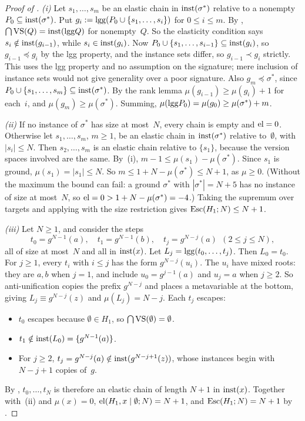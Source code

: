 \begin{proof}[Proof of ]
\emph{(i)} Let $s_1,\dots,s_m$ be an elastic chain in $\mathrm{inst}(\sigma^*)$ relative to a nonempty $P_0\subseteq\mathrm{inst}(\sigma^*)$. Put $g_i:=\mathrm{lgg}(P_0\cup\{s_1,\dots,s_i\})$ for $0\le i\le m$. By , $\bigcap\mathrm{VS}(Q)=\mathrm{inst}(\mathrm{lgg} Q)$ for nonempty~$Q$. So the elasticity condition says $s_i\notin\mathrm{inst}(g_{i-1})$, while $s_i\in\mathrm{inst}(g_i)$. Now $P_0\cup\{s_1,\dots,s_{i-1}\}\subseteq\mathrm{inst}(g_i)$, so $g_{i-1}\preceq g_i$ by the lgg property, and the instance sets differ, so $g_{i-1}\prec g_i$ strictly. This uses the lgg property and no assumption on the signature; mere inclusion of instance sets would not give generality over a poor signature. Also $g_m\preceq\sigma^*$, since $P_0\cup\{s_1,\dots,s_m\}\subseteq\mathrm{inst}(\sigma^*)$. By the rank lemma $\mu(g_{i-1})\ge\mu(g_i)+1$ for each~$i$, and $\mu(g_m)\ge\mu(\sigma^*)$. Summing, $\mu(\mathrm{lgg} P_0)=\mu(g_0)\ge\mu(\sigma^*)+m$.

\emph{(ii)} If no instance of $\sigma^*$ has size at most~$N$, every chain is empty and $\mathrm{el}=0$. Otherwise let $s_1,\dots,s_m$, $m\ge1$, be an elastic chain in $\mathrm{inst}(\sigma^*)$ relative to~$\emptyset$, with $|s_i|\le N$. Then $s_2,\dots,s_m$ is an elastic chain relative to $\{s_1\}$, because the version spaces involved are the same. By~(i), $m-1\le\mu(s_1)-\mu(\sigma^*)$. Since $s_1$ is ground, $\mu(s_1)=|s_1|\le N$. So $m\le1+N-\mu(\sigma^*)\le N+1$, as $\mu\ge0$. (Without the maximum the bound can fail: a ground $\sigma^*$ with $|\sigma^*|=N+5$ has no instance of size at most~$N$, so $\mathrm{el}=0>1+N-\mu(\sigma^*)=-4$.) Taking the supremum over targets and applying  with the size restriction gives $\mathrm{Esc}(H_1;N)\le N+1$.

\emph{(iii)} Let $N\ge1$, and consider the steps
\[
t_0=g^{N-1}(a),\quad t_1=g^{N-1}(b),\quad t_j=g^{N-j}(a)\ \ (2\le j\le N),
\]
all of size at most~$N$ and all in $\mathrm{inst}(x)$. Let $L_j=\mathrm{lgg}(t_0,\dots,t_j)$. Then $L_0=t_0$. For $j\ge1$, every $t_i$ with $i\le j$ has the form $g^{N-j}(u_i)$. The $u_i$ have mixed roots: they are $a,b$ when $j=1$, and include $u_0=g^{j-1}(a)$ and $u_j=a$ when $j\ge2$. So anti-unification copies the prefix $g^{N-j}$ and places a metavariable at the bottom, giving $L_j\equiv g^{N-j}(z)$ and $\mu(L_j)=N-j$. Each $t_j$ escapes:
\begin{itemize}
\item $t_0$ escapes because $\emptyset\in H_1$, so $\bigcap\mathrm{VS}(\emptyset)=\emptyset$.
\item $t_1\notin\mathrm{inst}(L_0)=\{g^{N-1}(a)\}$.
\item For $j\ge2$, $t_j=g^{N-j}(a)\notin\mathrm{inst}(g^{N-j+1}(z))$, whose instances begin with $N-j+1$ copies of~$g$.
\end{itemize}
By , $t_0,\dots,t_N$ is therefore an elastic chain of length $N+1$ in $\mathrm{inst}(x)$. Together with~(ii) and $\mu(x)=0$, $\mathrm{el}(H_1,x\mid\emptyset;N)=N+1$, and $\mathrm{Esc}(H_1;N)=N+1$ by .
\end{proof}

